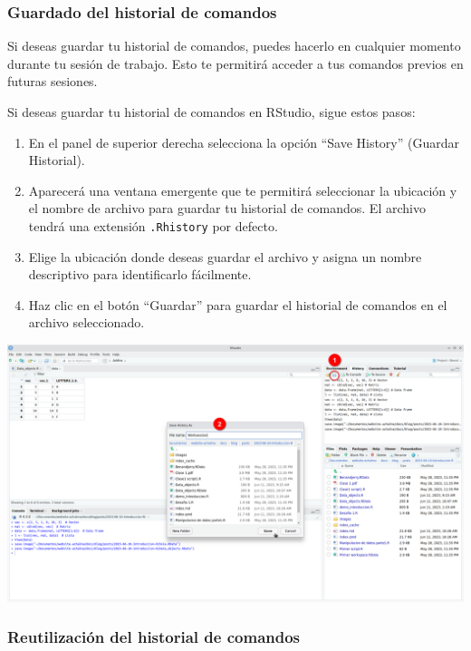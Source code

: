 \documentclass[
  a4paper,
]{article}
\providecommand{\tightlist}{%
  \setlength{\itemsep}{0pt}\setlength{\parskip}{0pt}}\usepackage{longtable,booktabs,array}
\begin{document}
\hypertarget{guardado-del-historial-de-comandos}{%
\subsubsection{Guardado del historial de
comandos}\label{guardado-del-historial-de-comandos}}

Si deseas guardar tu historial de comandos, puedes hacerlo en cualquier
momento durante tu sesión de trabajo. Esto te permitirá acceder a tus
comandos previos en futuras sesiones.

Si deseas guardar tu historial de comandos en RStudio, sigue estos
pasos:

\begin{enumerate}
\def\labelenumi{\arabic{enumi}.}
\tightlist
\item
  En el panel de superior derecha selecciona la opción ``Save History''
  (Guardar Historial).
\item
  Aparecerá una ventana emergente que te permitirá seleccionar la
  ubicación y el nombre de archivo para guardar tu historial de
  comandos. El archivo tendrá una extensión \texttt{.Rhistory} por
  defecto.
\item
  Elige la ubicación donde deseas guardar el archivo y asigna un nombre
  descriptivo para identificarlo fácilmente.
\item
  Haz clic en el botón ``Guardar'' para guardar el historial de comandos
  en el archivo seleccionado.
\end{enumerate}

\includegraphics{images/Screenshot_20230611_102856.png}

\hypertarget{reutilizaciuxf3n-del-historial-de-comandos}{%
\subsubsection{Reutilización del historial de
comandos}\label{reutilizaciuxf3n-del-historial-de-comandos}}
\end{document}
